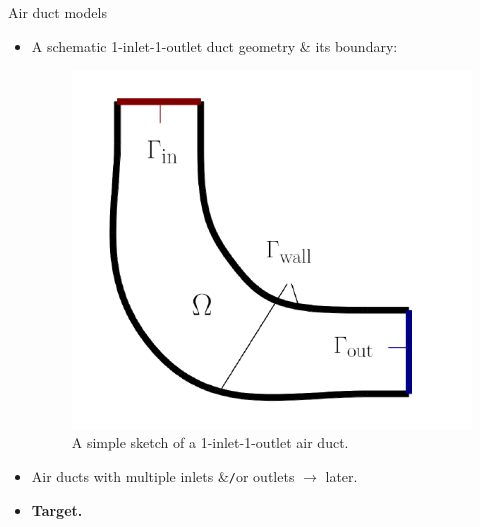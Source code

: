\documentclass[10pt
hyperref={
    pdfauthor={Hong Quan Ba Nguyen},
    pdftitle={Optimal Shape Design of Air Ducts in Combustion Engines: Design a General Framework},
    pdfsubject={Talk},
    pdfcreator={LaTeX},
}
]{beamer}
\begin{document}
\begin{frame}{Air duct models}
    \begin{itemize}
        \item A schematic 1-inlet-1-outlet duct geometry {\small\&} its boundary:
        \begin{figure}
            \centering
            \includegraphics[scale=0.55]{Geometry_Simple_Sketch}
            \caption{A simple sketch of a 1-inlet-1-outlet air duct.}
        \end{figure}
        \item Air ducts with multiple inlets {\small\&}\texttt{/}or outlets $\to$ later.
        \item \textbf{Target.} 
    \end{itemize}
\end{frame}
\end{document}
